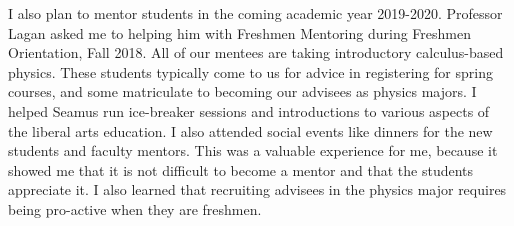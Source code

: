 \documentclass[../main.tex]{subfiles}
\begin{document}
I also plan to mentor students in the coming academic year 2019-2020.  Professor Lagan asked me to helping him with Freshmen Mentoring during Freshmen Orientation, Fall 2018.  All of our mentees are taking introductory calculus-based physics.  These students typically come to us for advice in registering for spring courses, and some matriculate to becoming our advisees as physics majors.  I helped Seamus run ice-breaker sessions and introductions to various aspects of the liberal arts education.  I also attended social events like dinners for the new students and faculty mentors.  This was a valuable experience for me, because it showed me that it is not difficult to become a mentor and that the students appreciate it.  I also learned that recruiting advisees in the physics major requires being pro-active when they are freshmen. \\ \hspace{0.1cm}
\end{document}
